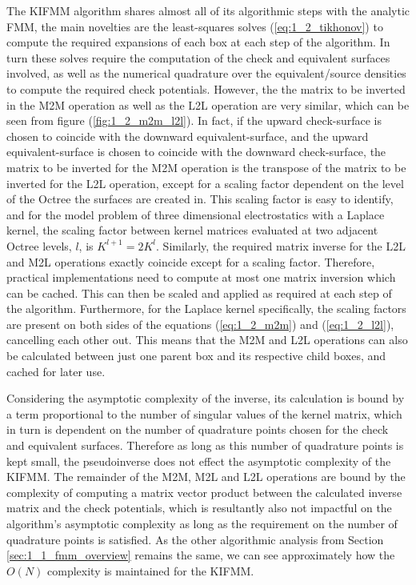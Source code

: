 The \gls{KIFMM} algorithm shares almost all of its algorithmic steps with the analytic \gls{FMM}, the
main novelties are the least-squares solves (\ref{eq:1_2_tikhonov}) to compute
the required expansions of each box at each step of the algorithm. In turn
these solves require the computation of the check and equivalent surfaces involved,
as well as the numerical quadrature over the equivalent/source densities to compute
the required check potentials. However, the the matrix to be inverted
in the M2M operation as well as the L2L operation are very similar, which can
be seen from figure (\ref{fig:1_2_m2m_l2l}). In fact, if
the upward \gls{check-surface} is chosen to coincide with the downward
\gls{equivalent-surface}, and the upward \gls{equivalent-surface} is chosen to
coincide with the downward \gls{check-surface}, the matrix to be inverted for the M2M
operation is the transpose of the matrix to be inverted for the L2L operation,
except for a scaling factor dependent on the level of the Octree the surfaces
are created in. This scaling factor is easy to identify, and for the model problem of
three dimensional electrostatics with a Laplace kernel, the scaling factor between
kernel matrices evaluated at two adjacent Octree levels, $l$, is $K^{l+1} = 2K^l$.
Similarly, the required matrix inverse for the L2L and M2L operations exactly coincide
except for a scaling factor. Therefore, practical implementations
need to compute at most one matrix inversion which can be cached. This can then
be scaled and applied as required at each step of the algorithm. Furthermore,
for the Laplace kernel specifically, the scaling factors are present on both sides
of the equations (\ref{eq:1_2_m2m}) and (\ref{eq:1_2_l2l}), cancelling each other out.
This means that the M2M and L2L operations can also be calculated between just one
parent box and its respective child boxes, and cached for later use.

Considering the asymptotic complexity of the inverse, its calculation is bound
by a term proportional to the number of singular values of the kernel
matrix, which in turn is dependent on the number of quadrature points chosen for
the check and equivalent surfaces. Therefore as long as this number of quadrature
points is kept small, the pseudoinverse does not effect the asymptotic complexity
of the \gls{KIFMM}. The remainder of the M2M, M2L and L2L operations are bound by
the complexity of computing a matrix vector product between the calculated inverse
matrix and the check potentials, which is resultantly also not impactful on the
algorithm's asymptotic complexity as long as the requirement on the number of
quadrature points is satisfied. As the other algorithmic analysis from
Section \ref{sec:1_1_fmm_overview} remains the same, we can see approximately how
the $O(N)$ complexity is maintained for the \gls{KIFMM}.

